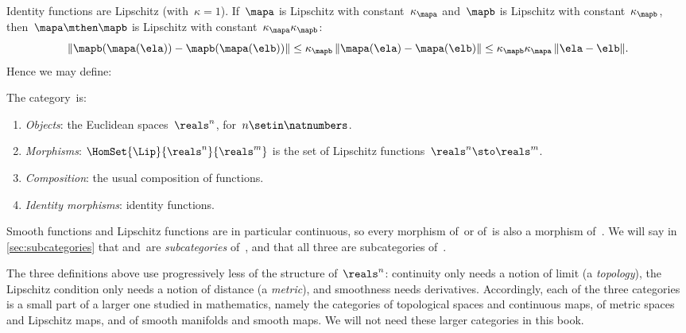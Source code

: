 Identity functions are Lipschitz (with~$\kappa = 1$).
If~$\mapa$ is Lipschitz with constant~$\kappa_\mapa$ and~$\mapb$ is Lipschitz with constant~$\kappa_\mapb$, then~$\mapa \mthen \mapb$ is Lipschitz with constant~$\kappa_\mapa \kappa_\mapb$:
\begin{equation}
    \lVert \mapb(\mapa(\ela)) - \mapb(\mapa(\elb)) \rVert
    \leq \kappa_\mapb \, \lVert \mapa(\ela) - \mapa(\elb) \rVert
    \leq \kappa_\mapb \kappa_\mapa \, \lVert \ela - \elb \rVert.
\end{equation}
Hence we may define:

\begin{ctdefinition}
    \label{def:cat-Lip}
    The category~\Lip is:
    \begin{enumerate}
        \item \emph{Objects}: the Euclidean spaces~$\reals^n$, for~$n \setin \natnumbers$.
        \item \emph{Morphisms}: $\HomSet{\Lip}{\reals^n}{\reals^m}$ is the set of Lipschitz functions~$\reals^n \sto \reals^m$.
        \item \emph{Composition}: the usual composition of functions.
        \item \emph{Identity morphisms}: identity functions.
    \end{enumerate}
\end{ctdefinition}

\begin{remark}
    Smooth functions and Lipschitz functions are in particular continuous, so every morphism of~\Smooth or of~\Lip is also a morphism of~\Cont.
    We will say in \cref{sec:subcategories} that \Smooth and~\Lip are \emph{subcategories} of~\Cont, and that all three are subcategories of~\Set.
\end{remark}

\begin{remark}
    The three definitions above use progressively less of the structure of~$\reals^n$: continuity only needs a notion of limit (a \emph{topology}), the Lipschitz condition only needs a notion of distance (a \emph{metric}), and smoothness needs derivatives.
    Accordingly, each of the three categories is a small part of a larger one studied in mathematics, namely the categories of topological spaces and continuous maps, of metric spaces and Lipschitz maps, and of smooth manifolds and smooth maps.
    We will not need these larger categories in this book.
\end{remark}

